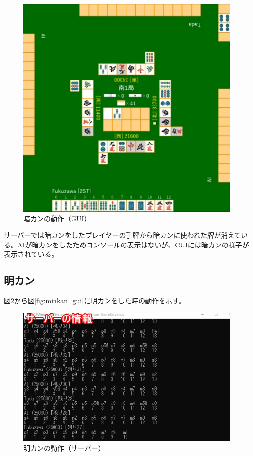 \documentclass[a4j,titlepage]{jsarticle}
\begin{document}
\begin{figure}[htbp]
  \centering
  \includegraphics[width = 0.8\linewidth]{images/ankan_gui.png}
  \caption{暗カンの動作（GUI）}
  \label{fig:ankan_gui}
\end{figure}

サーバーでは暗カンをしたプレイヤーの手牌から暗カンに使われた牌が消えている。AIが暗カンをしたためコンソールの表示はないが、GUIには暗カンの様子が表示されている。

\subsection{明カン}
図\ref{fig:minkan_server}から図\ref{fig:minkan_gui}に明カンをした時の動作を示す。

\begin{figure}[htbp]
  \centering
  \includegraphics[width = 0.8\linewidth]{images/minkan_server.png}
  \caption{明カンの動作（サーバー）}
  \label{fig:minkan_server}
\end{figure}
\end{document}
